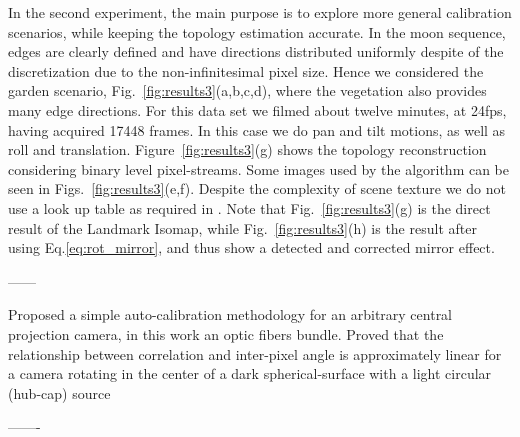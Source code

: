 In the second experiment, the main purpose is to explore more general calibration scenarios, while keeping the topology estimation accurate.
%
In the moon sequence, edges are clearly defined and have directions distributed uniformly despite of the discretization due to the non-infinitesimal pixel size.
%
Hence we considered the garden %
scenario, Fig.~\ref{fig:results3}(a,b,c,d), where the vegetation also provides many edge directions. For this data set we filmed about twelve minutes, at 24fps, having acquired 17448 frames. In this case we do pan and tilt motions, as well as roll and translation. %
%
Figure~\ref{fig:results3}(g) shows the topology reconstruction considering binary level pixel-streams. Some images used by the algorithm can be seen in Figs.~\ref{fig:results3}(e,f).
%
Despite the complexity of scene texture
we do not use a look up table as required in \cite{Grossmann10}. %
%
%
%
%
%
Note that Fig.~\ref{fig:results3}(g) is the direct result of the Landmark Isomap, while 
Fig.~\ref{fig:results3}(h) is the result after using Eq.\ref{eq:rot_mirror}, and thus show a detected and corrected mirror effect.
%
%


------

Proposed a simple auto-calibration methodology for an arbitrary central projection camera, in this work an optic fibers bundle. Proved that the relationship between correlation and inter-pixel angle is approximately linear for a camera rotating in the center of a dark spherical-surface with a light circular (hub-cap) source

-------
